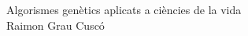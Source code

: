 \documentclass[titlepage,a4paper,12pt]{book}
\begin{document}
\begin{titlepage}
\begin{center}
{\Huge Algorismes genètics aplicats a ciències de la vida}\\[2cm]
{\Large  Raimon Grau Cuscó }\\[5cm]


\end{center}
\end{titlepage}

\newpage{\pagestyle{empty}\cleardoublepage}


\tableofcontents

\newpage{\pagestyle{empty}\cleardoublepage}



%

%
%
%











\end{document}
